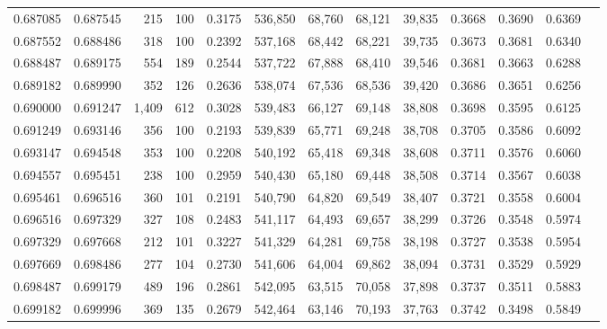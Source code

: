 \begin{tabular}{rrrrrrrrrrrrr}
0.687085 & 0.687545 &   215 & 100 &                                     0.3175 & 536,850 &  68,760 &  68,121 &  39,835 & 0.3668 & 0.3690 & 0.6369 \\
0.687552 & 0.688486 &   318 & 100 &                                     0.2392 & 537,168 &  68,442 &  68,221 &  39,735 & 0.3673 & 0.3681 & 0.6340 \\
0.688487 & 0.689175 &   554 & 189 &                                     0.2544 & 537,722 &  67,888 &  68,410 &  39,546 & 0.3681 & 0.3663 & 0.6288 \\
0.689182 & 0.689990 &   352 & 126 &                                     0.2636 & 538,074 &  67,536 &  68,536 &  39,420 & 0.3686 & 0.3651 & 0.6256 \\
0.690000 & 0.691247 & 1,409 & 612 &                                     0.3028 & 539,483 &  66,127 &  69,148 &  38,808 & 0.3698 & 0.3595 & 0.6125 \\
0.691249 & 0.693146 &   356 & 100 &                                     0.2193 & 539,839 &  65,771 &  69,248 &  38,708 & 0.3705 & 0.3586 & 0.6092 \\
0.693147 & 0.694548 &   353 & 100 &                                     0.2208 & 540,192 &  65,418 &  69,348 &  38,608 & 0.3711 & 0.3576 & 0.6060 \\
0.694557 & 0.695451 &   238 & 100 &                                     0.2959 & 540,430 &  65,180 &  69,448 &  38,508 & 0.3714 & 0.3567 & 0.6038 \\
0.695461 & 0.696516 &   360 & 101 &                                     0.2191 & 540,790 &  64,820 &  69,549 &  38,407 & 0.3721 & 0.3558 & 0.6004 \\
0.696516 & 0.697329 &   327 & 108 &                                     0.2483 & 541,117 &  64,493 &  69,657 &  38,299 & 0.3726 & 0.3548 & 0.5974 \\
0.697329 & 0.697668 &   212 & 101 &                                     0.3227 & 541,329 &  64,281 &  69,758 &  38,198 & 0.3727 & 0.3538 & 0.5954 \\
0.697669 & 0.698486 &   277 & 104 &                                     0.2730 & 541,606 &  64,004 &  69,862 &  38,094 & 0.3731 & 0.3529 & 0.5929 \\
0.698487 & 0.699179 &   489 & 196 &                                     0.2861 & 542,095 &  63,515 &  70,058 &  37,898 & 0.3737 & 0.3511 & 0.5883 \\
0.699182 & 0.699996 &   369 & 135 &                                     0.2679 & 542,464 &  63,146 &  70,193 &  37,763 & 0.3742 & 0.3498 & 0.5849 \\

\end{tabular}
